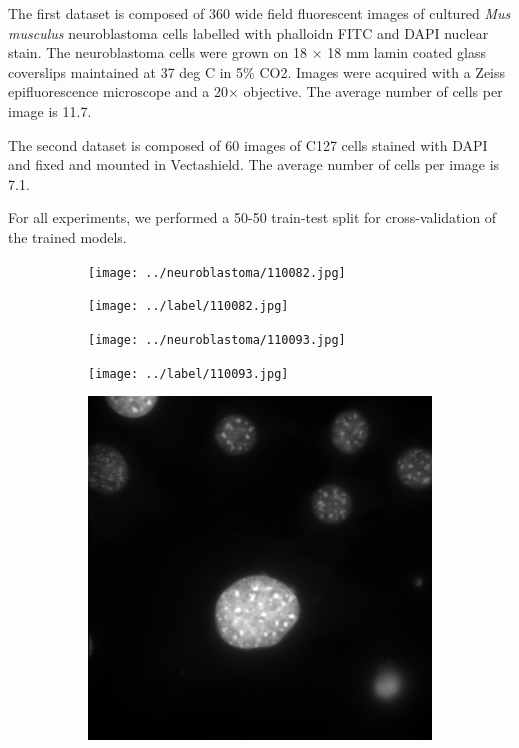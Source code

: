 \documentclass[10pt, journal, compsoc]{IEEEtran}
\begin{document}
The first dataset is composed of 360 wide field fluorescent images of cultured \textit{Mus musculus} neuroblastoma cells labelled with phalloidn FITC and DAPI nuclear stain. The neuroblastoma cells were grown on 18 $\times$ 18 mm lamin coated glass coverslips maintained at 37 deg C in 5\% CO2. Images were acquired with a Zeiss epifluorescence microscope and a 20$\times$ objective. The average number of cells per image is 11.7.

The second dataset is composed of 60 images of C127 cells stained with DAPI and fixed and mounted in Vectashield. The average number of cells per image is 7.1.

For all experiments, we performed a 50-50 train-test split for cross-validation of the trained models.
\begin{figure}
\centering
\begin{subfigure}[b]{0.24\linewidth}
\texttt{[image: ../neuroblastoma/110082.jpg]}
\caption{}
\end{subfigure}
\begin{subfigure}[b]{0.24\linewidth}
\texttt{[image: ../label/110082.jpg]}
\caption{}
\end{subfigure}
\begin{subfigure}[b]{0.24\linewidth}
\texttt{[image: ../neuroblastoma/110093.jpg]}
\caption{}
\end{subfigure}
\begin{subfigure}[b]{0.24\linewidth}
\texttt{[image: ../label/110093.jpg]}
\caption{}
\end{subfigure}
\begin{subfigure}[b]{0.24\linewidth}
\includegraphics[width=\linewidth]{c127/108636.jpg}

\end{subfigure}
\end{figure}
\end{document}
